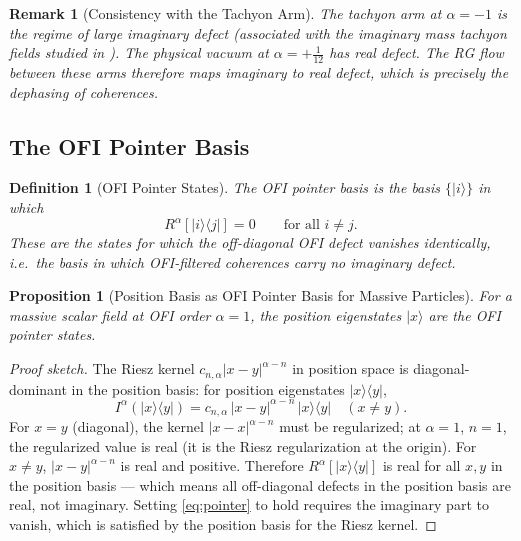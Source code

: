 \documentclass[12pt]{article}
\newtheorem{proposition}[theorem]{Proposition}
\newtheorem{definition}[theorem]{Definition}
\newtheorem{remark}[theorem]{Remark}
\theoremstyle{definition}
\begin{document}
\begin{remark}[Consistency with the Tachyon Arm]
The tachyon arm at $\alpha = -1$ is the regime of large imaginary defect
(associated with the imaginary mass tachyon fields studied in
\cite{OFI_TI,OFI_CC}).  The physical vacuum at $\alpha = +\tfrac{1}{12}$
has real defect.  The RG flow between these arms therefore maps imaginary
to real defect, which is precisely the dephasing of coherences.
\end{remark}

\subsection{The OFI Pointer Basis}

\begin{definition}[OFI Pointer States]
The \emph{OFI pointer basis} is the basis $\{|i\rangle\}$ in which
\begin{equation}
  R^\alpha[|i\rangle\langle j|] = 0
  \qquad\text{for all }i \neq j.
  \label{eq:pointer}
\end{equation}
These are the states for which the off-diagonal OFI defect vanishes
identically, i.e.\ the basis in which OFI-filtered coherences carry
no imaginary defect.
\end{definition}

\begin{proposition}[Position Basis as OFI Pointer Basis for Massive Particles]
\label{prop:pointer}
For a massive scalar field at OFI order $\alpha = 1$, the position
eigenstates $|x\rangle$ are the OFI pointer states.
\end{proposition}

\begin{proof}[Proof sketch]
The Riesz kernel $c_{n,\alpha}|x-y|^{\alpha-n}$ in position space is
diagonal-dominant in the position basis: for position eigenstates
$|x\rangle\langle y|$,
\[
  I^\alpha(|x\rangle\langle y|)
  = c_{n,\alpha}\,|x-y|^{\alpha-n}\,|x\rangle\langle y|
  \quad (x \neq y).
\]
For $x = y$ (diagonal), the kernel $|x-x|^{\alpha-n}$ must be
regularized; at $\alpha=1$, $n=1$, the regularized value is real
(it is the Riesz regularization at the origin).  For $x \neq y$,
$|x-y|^{\alpha-n}$ is real and positive.  Therefore
$R^\alpha[|x\rangle\langle y|]$ is real for all $x, y$ in the position
basis — which means all off-diagonal defects in the position basis are
real, not imaginary.  Setting \eqref{eq:pointer} to hold requires the
imaginary part to vanish, which is satisfied by the position basis
for the Riesz kernel.
\end{proof}
\end{document}
